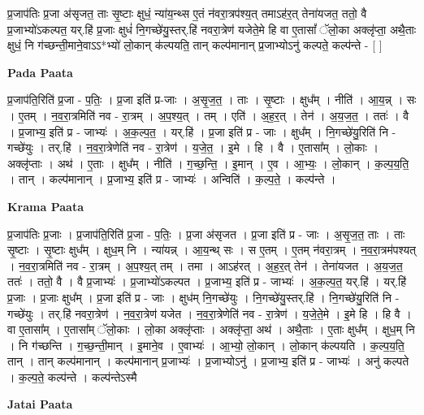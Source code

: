 \documentclass[17pt]{extarticle}
\begin{document}
प्र॒जाप॑तिः प्र॒जा अ॑सृजत॒ ताः सृ॒ष्टाः क्षुधं॒ न्या॑य॒न्थ्स ए॒तं न॑वरा॒त्रप॑श्य॒त् तमाऽह॑र॒त् तेना॑यजत॒ ततो॒ वै प्र॒जाभ्यो॑ऽकल्पत॒ यर्.हि॑ प्र॒जाः क्षुधं॑ नि॒गच्छे॑यु॒स्तर्.हि॑ नवरा॒त्रेण॑ यजेते॒मे हि वा ए॒तासां᳚ ॅलो॒का अक्लृ॑प्ता॒ अथै॒ताः क्षुधं॒ नि ग॑च्छन्ती॒माने॒वाऽऽ*भ्यो॑ लो॒कान् क॑ल्पयति॒ तान् कल्प॑मानान् प्र॒जाभ्योऽनु॑ कल्पते॒ कल्प॑न्ते - [  ] \newline

\textbf{Pada Paata} \newline

प्र॒जाप॑ति॒रिति॑ प्र॒जा - प॒तिः॒ । प्र॒जा इति॑ प्र-जाः । अ॒सृ॒ज॒त॒ । ताः । सृ॒ष्टाः । क्षुध᳚म् । नीति॑ । आ॒य॒न्न् । सः । ए॒तम् । न॒व॒रा॒त्रमिति॑ नव - रा॒त्रम् । अ॒प॒श्य॒त् । तम् । एति॑ । अ॒ह॒र॒त् । तेन॑ । अ॒य॒ज॒त॒ । ततः॑ । वै । प्र॒जाभ्य॒ इति॑ प्र - जाभ्यः॑ । अ॒क॒ल्प॒त॒ । यर्.हि॑ । प्र॒जा इति॑ प्र - जाः । क्षुध᳚म् । नि॒गच्छे॑यु॒रिति॑ नि - गच्छे॑युः । तर्.हि॑ । न॒व॒रा॒त्रेणेति॑ नव - रा॒त्रेण॑ । य॒जे॒त॒ । इ॒मे । हि । वै । ए॒तासा᳚म् । लो॒काः । अक्लृ॑प्ताः । अथ॑ । ए॒ताः । क्षुध᳚म् । नीति॑ । ग॒च्छ॒न्ति॒ । इ॒मान् । ए॒व । आ॒भ्यः॒ । लो॒कान् । क॒ल्प॒य॒ति॒ । तान् । कल्प॑मानान् । प्र॒जाभ्य॒ इति॑ प्र - जाभ्यः॑ । अन्विति॑ । क॒ल्प॒ते॒ । कल्प॑न्ते ।  \newline


\textbf{Krama Paata} \newline

प्र॒जाप॑तिः प्र॒जाः । प्र॒जाप॑ति॒रिति॑ प्र॒जा - प॒तिः॒ । प्र॒जा अ॑सृजत । प्र॒जा इति॑ प्र - जाः । अ॒सृ॒ज॒त॒ ताः । ताः सृ॒ष्टाः । सृ॒ष्टाः क्षुध᳚म् । क्षुध॒म् नि । न्या॑यन्न् । आ॒य॒न्थ् सः । स ए॒तम् । ए॒तम् न॑वरा॒त्रम् । न॒व॒रा॒त्रम॑पश्यत् । न॒व॒रा॒त्रमिति॑ नव - रा॒त्रम् । अ॒प॒श्य॒त् तम् । तमा । आऽह॑रत् । अ॒ह॒र॒त् तेन॑ । तेना॑यजत । अ॒य॒ज॒त॒ ततः॑ । ततो॒ वै । वै प्र॒जाभ्यः॑ । प्र॒जाभ्यो॑ऽकल्पत । प्र॒जाभ्य॒ इति॑ प्र - जाभ्यः॑ । अ॒क॒ल्प॒त॒ यर्.हि॑ । यर्.हि॑ प्र॒जाः । प्र॒जाः क्षुध᳚म् । प्र॒जा इति॑ प्र - जाः । क्षुध॑म् नि॒गच्छे॑युः । नि॒गच्छे॑यु॒स्तर्.हि॑ । नि॒गच्छे॑यु॒रिति॑ नि - गच्छे॑युः । तर्.हि॑ नवरा॒त्रेण॑ । न॒व॒रा॒त्रेण॑ यजेत । न॒व॒रा॒त्रेणेति॑ नव - रा॒त्रेण॑ । य॒जे॒ते॒मे । इ॒मे हि । हि वै । वा ए॒तासा᳚म् । ए॒तासा᳚म् ॅलो॒काः । लो॒का अक्लृ॑प्ताः । अक्लृ॑प्ता॒ अथ॑ । अथै॒ताः । ए॒ताः क्षुध᳚म् । क्षुध॒म् नि । नि ग॑च्छन्ति । ग॒च्छ॒न्ती॒मान् । इ॒माने॒व । ए॒वाभ्यः॑ । आ॒भ्यो॒ लो॒कान् । लो॒कान् क॑ल्पयति । क॒ल्प॒य॒ति॒ तान् । तान् कल्प॑मानान् । कल्प॑मानान् प्र॒जाभ्यः॑ । प्र॒जाभ्योऽनु॑ । प्र॒जाभ्य॒ इति॑ प्र - जाभ्यः॑ । अनु॑ कल्पते । क॒ल्प॒ते॒ कल्प॑न्ते । कल्प॑न्तेऽस्मै \newline

\textbf{Jatai Paata} \newline
\end{document}
